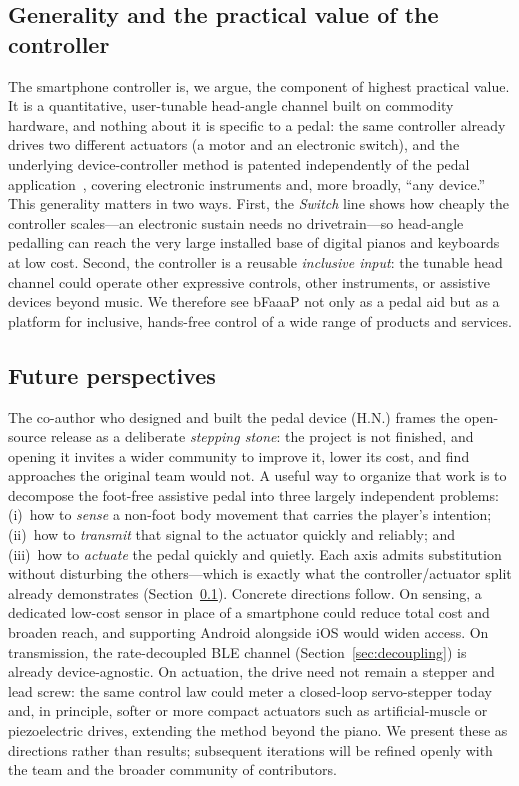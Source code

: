 \subsection{Generality and the practical value of the controller}
\label{sec:generality}
The smartphone controller is, we argue, the component of highest practical value.
It is a quantitative, user-tunable head-angle channel built on commodity hardware,
and nothing about it is specific to a pedal: the same controller already drives two
different actuators (a motor and an electronic switch), and the underlying
device-controller method is patented independently of the pedal
application~\cite{jp7004771}, covering electronic instruments and, more broadly,
``any device.'' This generality matters in two ways. First, the \emph{Switch} line
shows how cheaply the controller scales---an electronic sustain needs no
drivetrain---so head-angle pedalling can reach the very large installed base of
digital pianos and keyboards at low cost. Second, the controller is a reusable
\emph{inclusive input}: the tunable head channel could operate
other expressive controls, other instruments, or assistive devices beyond music.
We therefore see bFaaaP not only as a pedal aid but as a platform for inclusive,
hands-free control of a wide range of products and services.

\subsection{Future perspectives}
\label{sec:future}
The co-author who designed and built the pedal device (H.N.) frames the open-source
release as a deliberate \emph{stepping stone}: the project is not finished, and
opening it invites a wider community to improve it, lower its cost, and find
approaches the original team would not. A useful way to organize that work is to
decompose the foot-free assistive pedal into three largely independent problems:
(i)~how to \emph{sense} a non-foot body movement that carries the player's intention;
(ii)~how to \emph{transmit} that signal to the actuator quickly and reliably; and
(iii)~how to \emph{actuate} the pedal quickly and quietly. Each axis admits
substitution without disturbing the others---which is exactly what the
controller/actuator split already demonstrates (Section~\ref{sec:generality}).
Concrete directions follow. On sensing, a dedicated low-cost sensor in place of a
smartphone could reduce total cost and broaden reach, and supporting Android
alongside iOS would widen access. On transmission, the rate-decoupled BLE channel
(Section~\ref{sec:decoupling}) is already device-agnostic. On actuation, the drive
need not remain a stepper and lead screw: the same control law could meter a
closed-loop servo-stepper today and, in principle, softer or more compact actuators
such as artificial-muscle or piezoelectric drives, extending the method beyond the
piano. We present these as directions rather than results; subsequent iterations
will be refined openly with the team and the broader community of contributors.

